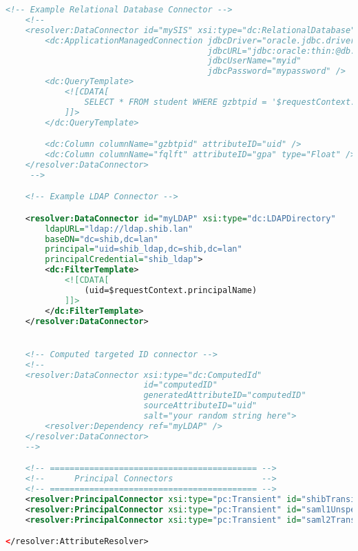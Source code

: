 \begin{lstlisting}[language=xml]
    <!-- Example Relational Database Connector -->
    <!--
    <resolver:DataConnector id="mySIS" xsi:type="dc:RelationalDatabase">
        <dc:ApplicationManagedConnection jdbcDriver="oracle.jdbc.driver.OracleDriver"
                                         jdbcURL="jdbc:oracle:thin:@db.example.org:1521:SomeDB"
                                         jdbcUserName="myid"
                                         jdbcPassword="mypassword" />
        <dc:QueryTemplate>
            <![CDATA[
                SELECT * FROM student WHERE gzbtpid = '$requestContext.principalName'
            ]]>
        </dc:QueryTemplate>

        <dc:Column columnName="gzbtpid" attributeID="uid" />
        <dc:Column columnName="fqlft" attributeID="gpa" type="Float" />
    </resolver:DataConnector>
     -->

    <!-- Example LDAP Connector -->

    <resolver:DataConnector id="myLDAP" xsi:type="dc:LDAPDirectory"
        ldapURL="ldap://ldap.shib.lan"
        baseDN="dc=shib,dc=lan"
        principal="uid=shib_ldap,dc=shib,dc=lan"
        principalCredential="shib_ldap">
        <dc:FilterTemplate>
            <![CDATA[
                (uid=$requestContext.principalName)
            ]]>
        </dc:FilterTemplate>
    </resolver:DataConnector>


    <!-- Computed targeted ID connector -->
    <!--
    <resolver:DataConnector xsi:type="dc:ComputedId"
                            id="computedID"
                            generatedAttributeID="computedID"
                            sourceAttributeID="uid"
                            salt="your random string here">
        <resolver:Dependency ref="myLDAP" />
    </resolver:DataConnector>
    -->

    <!-- ========================================== -->
    <!--      Principal Connectors                  -->
    <!-- ========================================== -->
    <resolver:PrincipalConnector xsi:type="pc:Transient" id="shibTransient" nameIDFormat="urn:mace:shibboleth:1.0:nameIdentifier"/>
    <resolver:PrincipalConnector xsi:type="pc:Transient" id="saml1Unspec" nameIDFormat="urn:oasis:names:tc:SAML:1.1:nameid-format:unspecified"/>
    <resolver:PrincipalConnector xsi:type="pc:Transient" id="saml2Transient" nameIDFormat="urn:oasis:names:tc:SAML:2.0:nameid-format:transient"/>

</resolver:AttributeResolver>
\end{lstlisting}


